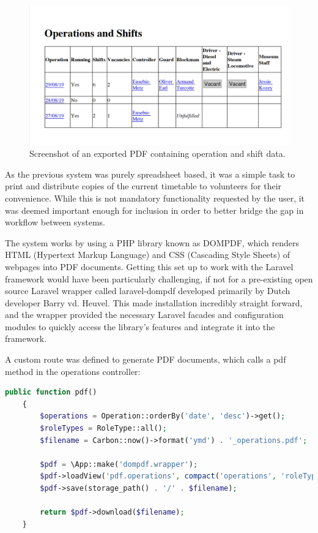 \begin{figure}[!ht]
    \centering
    \includegraphics[width=1.0\textwidth]{Figures/screenshot-pdf}
    \caption{Screenshot of an exported PDF containing operation and shift data.}
    \label{fig:pdf}
\end{figure}

As the previous system was purely spreadsheet based, it was a simple task to print and distribute copies of the current timetable to volunteers for their convenience. While this is not mandatory functionality requested by the user, it was deemed important enough for inclusion in order to better bridge the gap in workflow between systems. 

The system works by using a PHP library known as DOMPDF, which renders HTML (Hypertext Markup Language) and CSS (Cascading Style Sheets) of webpages into PDF documents. Getting this set up to work with the Laravel framework would have been particularly challenging, if not for a pre-existing open source Laravel wrapper called laravel-dompdf developed primarily by Dutch developer Barry vd. Heuvel. This made installation incredibly straight forward, and the wrapper provided the necessary Laravel facades and configuration modules to quickly access the library's features and integrate it into the framework. \cite{dompdf1} \cite{Heuvel1}

A custom route was defined to generate PDF documents, which calls a pdf method in the operations controller:

\begin{lstlisting}[language=PHP, breaklines]
    public function pdf()
    {
        $operations = Operation::orderBy('date', 'desc')->get();
        $roleTypes = RoleType::all();
        $filename = Carbon::now()->format('ymd') . '_operations.pdf';
    
        $pdf = \App::make('dompdf.wrapper');
        $pdf->loadView('pdf.operations', compact('operations', 'roleTypes'));
        $pdf->save(storage_path() . '/' . $filename);
    
        return $pdf->download($filename);
    }
\end{lstlisting}

